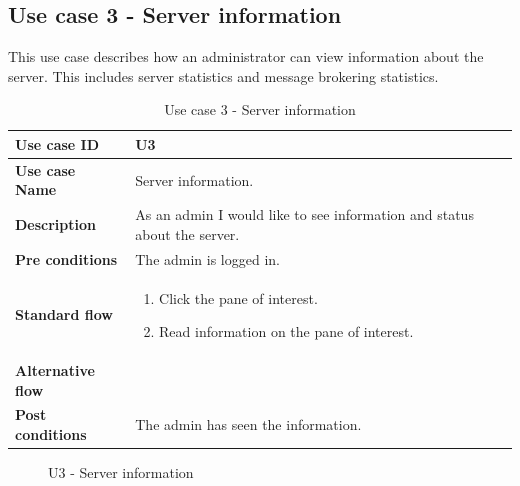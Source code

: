 \clearpage

\subsection{Use case 3 - Server information}
\label{subsec:requirements_engineering-use_cases-server_information}

This use case describes how an administrator can view information about the server. This includes server statistics and message brokering statistics. 

\begin{table}[ht!]
\centering
\begin{tabular}{|l|p{5cm}|}
\hline
\textbf{Use case ID} & U3 \\ \hline
\textbf{Use case Name} & Server information. \\ \hline
\textbf{Description} & As an admin I would like to see information and status about the server.  \\ \hline
\textbf{Pre conditions} & The admin is logged in.\\ \hline
\textbf{Standard flow} & \begin{enumerate}
\item Click the pane of interest.
\item Read information on the pane of interest.  
\end{enumerate} \\ \hline
\textbf{Alternative flow} & \\ \hline
\textbf{Post conditions} & The admin has seen the information. \\ \hline
\end{tabular}
\caption{Use case 3 - Server information}
\label{uc3}
\end{table}

\begin{center}
  \begin{figure}[ht!]
    \caption{U3 - Server information}
    \label{fig:u3}
  \end{figure}
\end{center}

